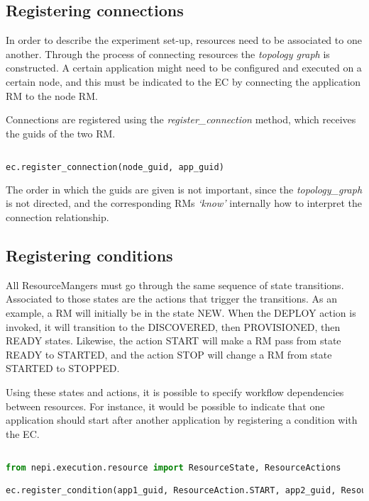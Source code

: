 \subsection{Registering connections}

In order to describe the experiment set-up, resources need to be 
associated to one another. Through the process of connecting resources
the \emph{topology graph} is constructed. A certain application might
need to be configured and executed on a certain node, and this
must be indicated to the EC by connecting the application RM to the node
RM.

Connections are registered using the \emph{register\_connection} method,
which receives the guids of the two RM.

\begin{lstlisting}[language=Python]

ec.register_connection(node_guid, app_guid)

\end{lstlisting}

The order in which the guids are given is not important, since the
\emph{topology\_graph} is not directed, and the corresponding 
RMs \emph{`know'} internally how to interpret the connection 
relationship.


\subsection{Registering conditions}

All ResourceMangers must go through the same sequence of state transitions.
Associated to those states are the actions that trigger the transitions.
As an example, a RM will initially be in the state NEW. When the DEPLOY action
is invoked, it will transition to the DISCOVERED, then PROVISIONED, then READY
states. Likewise, the action START will make a RM pass from state READY to 
STARTED, and the action STOP will change a RM from state STARTED to STOPPED.

Using these states and actions, it is possible to specify workflow dependencies 
between resources. For instance, it would be possible to indicate that
one application should start after another application by registering a 
condition with the EC.

\begin{lstlisting}[language=Python]

from nepi.execution.resource import ResourceState, ResourceActions

ec.register_condition(app1_guid, ResourceAction.START, app2_guid, ResourceState.STARTED)

\end{lstlisting}

